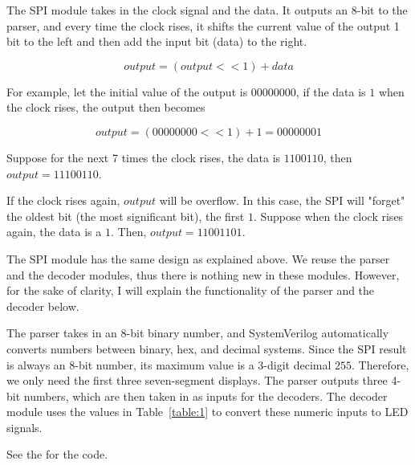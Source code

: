 \documentclass[12pt]{article}
\begin{document}
The SPI module takes in the clock signal and the data. It outputs an 8-bit to the parser, and every time the clock rises, it shifts the current value of the output 1 bit to the left and then add the input bit (data) to the right.

\begin{equation} \label{equation:1}
  output = (output << 1) + data
\end{equation}

For example, let the initial value of the output is $00000000$, if the data is $1$ when the clock rises, the output then becomes

\begin{equation} \label{equation:2}
  output = (00000000 << 1) + 1 = 00000001
\end{equation}

Suppose for the next 7 times the clock rises, the data is $1100110$, then $output = 11100110$.

If the clock rises again, $output$ will be overflow. In this case, the SPI will "forget" the oldest bit (the most significant bit), the first $1$. Suppose when the clock rises again, the data is a $1$. Then, $output = 11001101$.

The SPI module has the same design as explained above. We reuse the parser and the decoder modules, thus there is nothing new in these modules. However, for the sake of clarity, I will explain the functionality of the parser and the decoder below.

The parser takes in an 8-bit binary number, and SystemVerilog automatically converts numbers between binary, hex, and decimal systems. Since the SPI result is always an 8-bit number, its maximum value is a 3-digit decimal $255$. Therefore, we only need the first three seven-segment displays. The parser outputs three 4-bit numbers, which are then taken in as inputs for the decoders. The decoder module uses the values in Table~\ref{table:1} to convert these numeric inputs to LED signals.

See the  for the code.
\end{document}

